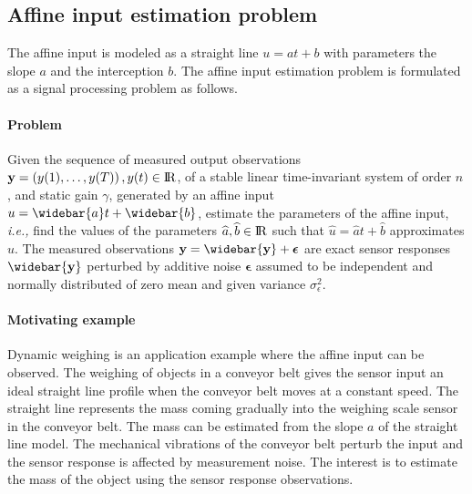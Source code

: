 \subsection{Affine input estimation problem}

The affine input is modeled as a straight line $u = {a} t + {b}$ with parameters the slope $a$ and the interception $b$.
The affine input estimation problem is formulated as a signal processing problem as follows. 


\paragraph{Problem} 
Given the sequence of measured output observations $\mathbf{y} = \left( y(1),\ldots,y(T)\right), y(t) \in {\rm I\!R}$, of a stable linear time-invariant system of order $n$, and static gain $\gamma$, generated by an affine input $u = \widebar{a} t + \widebar{b}$, estimate the parameters of the affine input, \textit{i.e.,} find the values of the parameters $\widehat{a}, \widehat{b} \in {\rm I\!R}$ such that $\widehat{u} = \widehat{a} t + \widehat{b}$ approximates $u$.
The measured observations $\mathbf{y} = \widebar{\mathbf{y}} + \bm{\epsilon}$ are exact sensor responses $\widebar{\mathbf{y}}$ perturbed by additive noise  $\bm{\epsilon}$ assumed to be independent and normally distributed of zero mean and given variance $\sigma_{\epsilon}^2$.

\paragraph{Motivating example}
Dynamic weighing is an application example where the affine input can be observed.
The weighing of objects in a conveyor belt gives the sensor input an ideal straight line profile when the conveyor belt moves at a constant speed.
The straight line represents the mass coming gradually into the weighing scale sensor in the conveyor belt.
The mass can be estimated from the slope $a$ of the straight line model. 
The mechanical vibrations of the conveyor belt perturb the input and the sensor response is affected by measurement noise.
The interest is to estimate the mass of the object using the sensor response observations.

